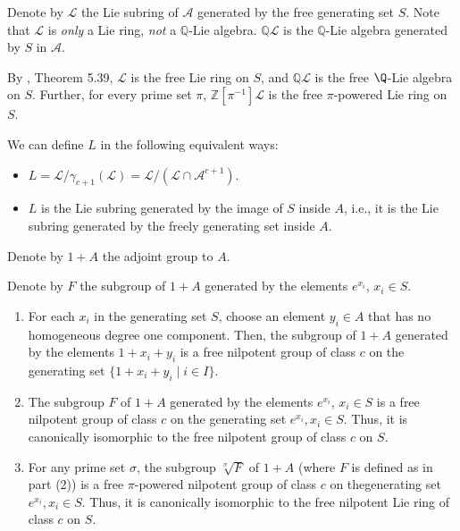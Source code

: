 \documentclass{ucetd}
\begin{document}
Denote by $\mathcal{L}$ the Lie subring of $\mathcal{A}$ generated by
the free generating set $S$. Note that $\mathcal{L}$ is {\em only} a
Lie ring, {\em not} a $\mathbb{Q}$-Lie
algebra. $\mathbb{Q}\mathcal{L}$ is the $\mathbb{Q}$-Lie algebra
generated by $S$ in $\mathcal{A}$.

By \cite{Khukhro}, Theorem 5.39, $\mathcal{L}$ is the free Lie ring on
$S$, and $\mathbb{Q}\mathcal{L}$ is the free $\Q$-Lie algebra on
$S$. Further, for every prime set $\pi$,
$\mathbb{Z}[\pi^{-1}]\mathcal{L}$ is the free $\pi$-powered Lie ring
on $S$.

We can define $L$ in the following equivalent ways:

\begin{itemize}
\item $L = \mathcal{L}/\gamma_{c+1}(\mathcal{L}) =
  \mathcal{L}/(\mathcal{L} \cap \mathcal{A}^{c+1})$.
\item $L$ is the Lie subring generated by the image of $S$ inside $A$,
  i.e., it is the Lie subring generated by the freely generating set
  inside $A$.
\end{itemize}

Denote by $1 + A$ the adjoint group to $A$.

Denote by $F$ the subgroup of $1 + A$ generated by the elements
$e^{x_i}$, $x_i \in S$.

\begin{theorem}\label{thm:free-nilpotent}
  \begin{enumerate}
  \item For each $x_i$ in the generating set $S$, choose an element $y_i
    \in A$ that has no homogeneous degree one component. Then, the
    subgroup of $1 + A$ generated by the elements $1 + x_i + y_i$ is a
    free nilpotent group of class $c$ on the generating set $\{ 1 +
    x_i + y_i \mid i \in I \}$.
  \item The subgroup $F$ of $1 + A$ generated by the elements
    $e^{x_i}$, $x_i \in S$ is a free nilpotent group of class $c$ on
    the generating set $e^{x_i}, x_i \in S$. Thus, it is canonically
    isomorphic to the free nilpotent group of class $c$ on $S$.
  \item For any prime set $\sigma$, the subgroup $\sqrt[\sigma]{F}$ of
    $1 + A$ (where $F$ is defined as in part (2)) is a free
    $\pi$-powered nilpotent group of class $c$ on thegenerating set
    $e^{x_i}, x_i \in S$. Thus, it is canonically isomorphic to the
    free nilpotent Lie ring of class $c$ on $S$.
  \end{enumerate}
\end{theorem}
\end{document}
